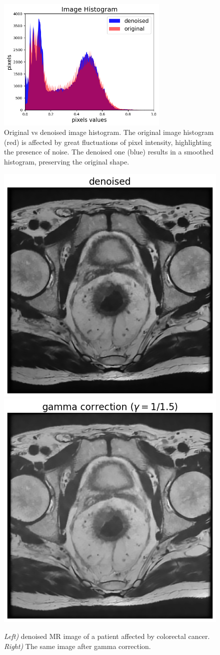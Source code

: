 \documentclass{standalone}
\begin{document}
\begin{figure}[htp]

    \centering
    \includegraphics[width=0.73\textwidth]{../images/histogram.png}

    
    \caption{Original vs denoised image histogram. The original image histogram (red) is affected by great fluctuations of pixel intensity, highlighting the presence of noise. The denoised one (blue) results in a smoothed histogram, preserving the original shape.}
    \label{histo}
    
    \end{figure}

\begin{figure}[htp]

    \centering
    \includegraphics[width=.49\textwidth]{../images/denoised.png}
    \includegraphics[width=.49\textwidth]{../images/gammacorrection.png}
    
    \caption{ \textit{ Left)} denoised MR image of a patient affected by colorectal cancer.\textit{ Right)} The same image after gamma correction.}
    \label{denoisedgamma}
    
    \end{figure}
\end{document}
